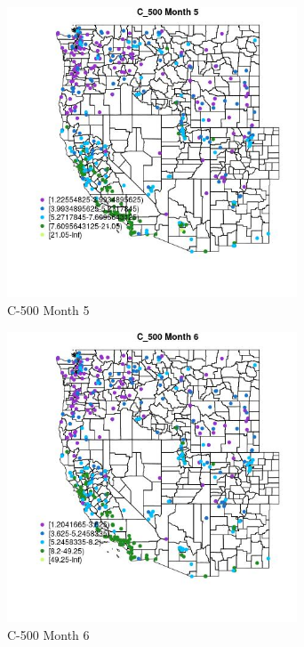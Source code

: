 \begin{figure} 
\centering  
\includegraphics[width=0.77\textwidth]{Code_Outputs/ML_input_report_ML_input_PM25_Step5_part_d_de_duplicated_aves_ML_input_MapObsMo5C_500.jpg} 
\caption{\label{fig:ML_input_report_ML_input_PM25_Step5_part_d_de_duplicated_aves_ML_inputMapObsMo5C_500}C-500 Month 5} 
\end{figure} 
 

\begin{figure} 
\centering  
\includegraphics[width=0.77\textwidth]{Code_Outputs/ML_input_report_ML_input_PM25_Step5_part_d_de_duplicated_aves_ML_input_MapObsMo6C_500.jpg} 
\caption{\label{fig:ML_input_report_ML_input_PM25_Step5_part_d_de_duplicated_aves_ML_inputMapObsMo6C_500}C-500 Month 6} 
\end{figure} 
 


